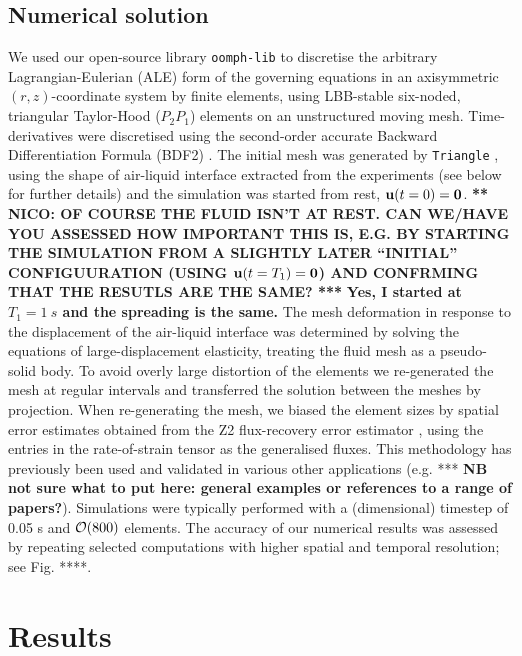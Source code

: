 \documentclass[aip,graphicx]{revtex4-1}
\begin{document}
\subsection{Numerical solution}
We used our open-source library \texttt{oomph-lib} \cite{HeilHazelOomph2006}
to discretise the arbitrary Lagrangian-Eulerian (ALE) form
\cite{donea1982arbitrary} of
the governing equations in an axisymmetric $(r,z)$-coordinate system 
by finite elements, using LBB-stable
\cite{sani2000incompressible}
six-noded, triangular Taylor-Hood ($P_2 P_1$)
elements\cite{taylor1973numerical} on an unstructured moving mesh. 
Time-derivatives were discretised using the second-order accurate Backward
Differentiation Formula (BDF2) \cite{sani2000incompressible}.
The initial mesh was generated by \texttt{Triangle} \cite{shewchuk96b},
using the shape of air-liquid interface extracted from the
experiments (see below for further details) and the simulation was
started from rest, ${\bf u}(t=0)={\bf 0}$. {\bf *** NICO: OF COURSE
  THE FLUID ISN'T AT REST. CAN WE/HAVE YOU ASSESSED HOW IMPORTANT THIS
IS, E.G. BY STARTING THE SIMULATION FROM A SLIGHTLY LATER ``INITIAL''
CONFIGUURATION (USING ${\bf u}(t=T_1)={\bf 0}$) AND CONFRMING 
THAT THE RESUTLS ARE THE SAME? ***}
{\bf Yes, I started at $T_1=1~s$ and the spreading is the same.}
The mesh deformation in response
to the displacement of the air-liquid interface was determined by 
solving the equations of large-displacement elasticity, 
treating the fluid mesh as a pseudo-solid body. To avoid overly large 
distortion of the elements we re-generated the mesh at regular 
intervals and transferred the solution between the meshes by
projection. When re-generating the mesh, we biased the element sizes
by spatial error estimates obtained from the Z2 flux-recovery error
estimator \cite{zienkiewicz1992superconvergent}, using the entries in the rate-of-strain tensor as the
generalised fluxes. This methodology has previously been 
used and validated in various other applications (e.g. *** {\bf NB not
sure what to put here: general examples or references to a range of papers?}).
Simulations were typically performed with a (dimensional) timestep of 
0.05 s and ${\cal O}(800)$ elements. The accuracy of our numerical 
results was assessed by repeating selected computations with higher 
spatial and temporal resolution; see Fig. ****.


\section{Results}
\end{document}
